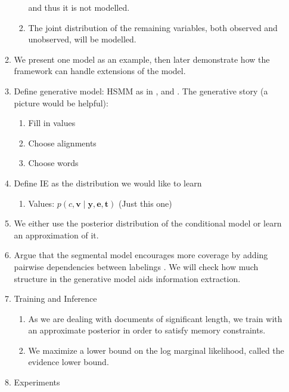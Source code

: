 \documentclass[11pt]{article}
\newcommand{\be}{\mathbf{e}}
\newcommand{\br}{\mathbf{r}}
\newcommand{\bt}{\mathbf{t}}
\newcommand{\bv}{\mathbf{v}}
\newcommand{\by}{\mathbf{y}}
\begin{document}
\begin{enumerate}
\begin{enumerate}
\begin{enumerate}
            and thus it is not modelled.
        \item The joint distribution of the remaining variables,
            both observed and unobserved, will be modelled.
        \end{enumerate}
    \item We present one model as an example, then later demonstrate how the framework
        can handle extensions of the model.
    \item Define generative model: HSMM as in \citep{liang2009semalign},
        and \citep{wiseman2018template}.
        The generative story (a picture would be helpful):
        \begin{enumerate}
        \item Fill in values
        \item Choose alignments
        \item Choose words
        \end{enumerate}
    \item Define IE as the distribution we would like to learn
        \begin{enumerate}
        \item Values: $p(c,\bv\mid\by,\be,\bt)$ (Just this one)
        \end{enumerate}
    \item We either use the posterior distribution of the conditional model
        or learn an approximation of it.
    \item Argue that the segmental model encourages more coverage
        by adding pairwise dependencies between labelings \citep{liang2009semalign}.
        We will check how much structure in the generative model
        aids information extraction.
    \item Training and Inference
        \begin{enumerate}
        \item As we are dealing with documents of significant length,
            we train with an approximate posterior in order to satisfy memory constraints.
        \item We maximize a lower bound on the log marginal likelihood,
            called the evidence lower bound.
        \end{enumerate}
    \item Experiments
        \begin{enumerate}

\end{enumerate}
\end{enumerate}
\end{enumerate}
\end{document}
